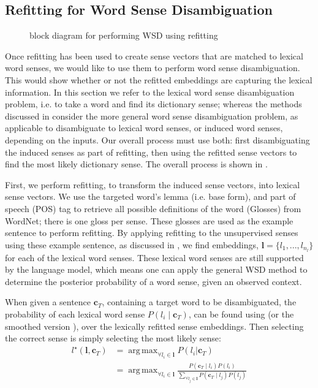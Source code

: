 \documentclass{sig-alternate}
\renewcommand{\c}{\mathbf{c}}
\renewcommand{\l}{\mathbf{l}}
\DeclareMathOperator*{\argmax}{arg\,max}
\begin{document}
\subsection{Refitting for Word Sense Disambiguation} 
\begin{figure}
	\begin{adjustbox}{max width=\columnwidth}
		
	\end{adjustbox}
	\caption{ block diagram for performing WSD using refitting \label{WSDBlock}} 
\end{figure}
Once refitting has been used to create sense vectors that are matched to lexical word senses, we would like to use them to perform word sense disambiguation. This would show whether or not the refitted embeddings are capturing the lexical information. In this section we refer to the lexical word sense disambiguation problem, i.e. to take a word and find its dictionary sense; whereas the methods discussed in  consider the more general word sense disambiguation problem, as applicable to disambiguate to lexical word senses, or induced word senses, depending on the inputs.
Our overall process must use both: first disambiguating the induced senses as part of refitting, then using the refitted sense vectors to find the most likely dictionary sense.
The overall process is shown in .

First, we perform refitting, to transform the induced sense vectors, into lexical sense vectors.
We use the targeted word's lemma (i.e. base form), and part of speech (POS) tag to retrieve all possible definitions of the word (Glosses) from WordNet; there is one gloss per sense. These glosses are used as the example sentence to perform refitting. By applying refitting to the unsupervised senses using these example sentence, as discussed in , we find embeddings, $\l=\{l_1,..., l_{n_l}\}$ for each of the lexical word senses. These lexical word senses are still supported by the language model, which means one can apply the general WSD method to determine the posterior probability of a word sense, given an observed context. 

When given a sentence $\c_{T}$, containing a target word to be disambiguated, 
the probability of each lexical word sense $P(l_i \mid \c_{T})$, can be found using  (or the smoothed version ), over the lexically refitted sense embeddings. Then selecting the correct sense is simply selecting the most likely sense:
\begin{equation}
\begin{aligned}\label{eq:lexicalwsd}
l^\star (\l, \c_T) &= \argmax_{\forall l_i \in \l} P(l_i|\c_T) \\
&= \argmax_{\forall l_i \in \l} \frac{P(\c_T \mid l_i)P(l_i)}{\sum_{\forall l_j \in \l} P(\c_T \mid l_j)P(l_j)}
\end{aligned}
\end{equation}
\end{document}
